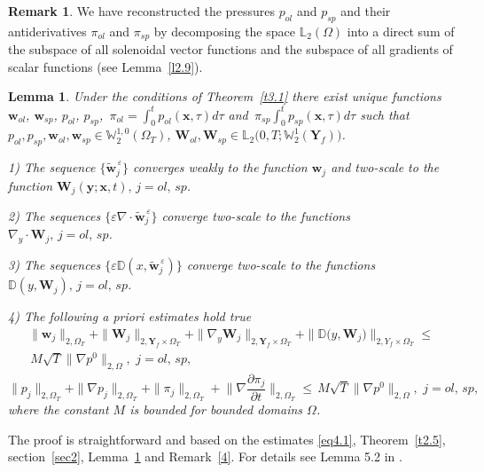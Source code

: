 \documentclass{article}
\theoremstyle{plain}
\newtheorem{lemma}[theorem]{Lemma}
\theoremstyle{definition}
\newtheorem{remark}[theorem]{Remark}
\numberwithin{equation}{section}
\begin{document}
\begin{remark}\label{5.1}
We have reconstructed the pressures ${p}_{ol}$ and ${p}_{sp}$ and their antiderivatives ${\pi}_{ol}$ and ${\pi}_{sp}$ by decomposing the space $\mathbb{L}_{2}(\Omega)$ into a direct sum of the subspace of all
solenoidal vector functions and the subspace of all gradients of scalar functions (see Lemma~\ref{l2.9}).
\end{remark}
\begin{lemma}\label{l5.2}
Under the conditions of Theorem~\ref{t3.1} there exist unique functions $\boldsymbol{w}_{ol}$, $\boldsymbol{w}_{sp}$, $p_{ol}$, $p_{sp}$, $\displaystyle\,{\pi}_{ol}=\int_{0}^{t}p_{ol}(\boldsymbol{x},\tau)d\tau$ and $\displaystyle\,{\pi}_{sp}\int_{0}^{t}p_{sp}(\boldsymbol{x},\tau)d\tau$ such that
$p_{ol}, p_{sp},\boldsymbol{w}_{ol}, \boldsymbol{w}_{sp}\in\mathbb{W}^{1,0}_{2}(\Omega_{T})$,
$\boldsymbol{W}_{ol}, \boldsymbol{W}_{sp}\in\mathbb{L}_{2}\big(0,T;\mathbb{W}^{1}_{2}(\textbf{Y}_{f})\big)$.

1) The sequence $\{\widetilde{\boldsymbol{w}}^{\,\varepsilon}_{j}\}$ converges weakly to the function $\boldsymbol{w}_{j}$ and two-scale to the function
$\boldsymbol{W}_{j}(\boldsymbol{y};\boldsymbol{x},t),\,j=ol,\,sp$.

2) The sequences $\{\varepsilon\nabla\cdot\widetilde{\boldsymbol{w}}^{\,\varepsilon}_{j}\}$ converge two-scale to the functions $\nabla_{y}\cdot\boldsymbol{W}_{j},\,j=ol,\,sp$.

3) The sequences $\{\varepsilon\mathbb{D}(x,\widetilde{\boldsymbol{w}}^{\,\varepsilon}_{j})\}$ converge two-scale to the functions $\mathbb{D}(y,\boldsymbol{W}_{j}),\,j=ol,\,sp$.

4) The following a priori estimates hold true
\begin{multline}\label{eq5.1}
\|{\boldsymbol{w}}_{j}\|_{2,\Omega_{T}}+\|\boldsymbol{W}_{j}\|_{2,\textbf{Y}_{f}\times\Omega_{T}}+
\|\nabla_{y}\boldsymbol{W}_{j}\|_{2,{\textbf{Y}}_{f}\times\Omega_{T}}+
\|\mathbb{D}\big(y,\boldsymbol{W}_{j})\|_{2,{Y}_{f}\times\Omega_{T}}\leqslant
\\
\,{M}\sqrt{T}\|\nabla{p}^{0}\|_{2,\Omega},\,\,j=ol,\,sp,
\end{multline}
\begin{equation}\label{eq5.2}
\|{p}_{j}\|_{2,\Omega_{T}}+\|\nabla{p}_{j}\|_{2,\Omega_{T}}+\|{\pi}_{j}\|_{2,\Omega_{T}}+
\Big\|\nabla\frac{\partial{\pi}_{j}}{\partial{t}}\Big\|_{2,\Omega_{T}}\leqslant\,
{M}\sqrt{T}\|\nabla{p}^{0}\|_{2,\Omega},\,\,j=ol,\,sp,
\end{equation}
where the constant $M$ is bounded for bounded domains $\Omega$.
\end{lemma}
The proof is straightforward and based on the estimates \eqref{eq4.1}, Theorem~\ref{t2.5}, section~\ref{sec2}, Lemma~\ref{l5.2} and Remark~\ref{4}. For details see Lemma 5.2 in \cite{15}.
\end{document}
